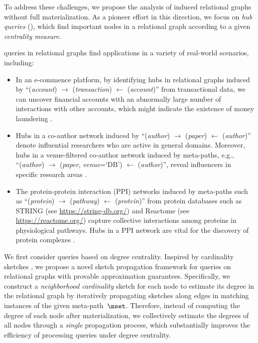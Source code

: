 To address these challenges, we propose the analysis of induced relational graphs without full materialization. As a pioneer effort in this direction, we focus on \emph{hub queries} (\ced), which find important nodes in a relational graph according to a given \emph{centrality measure}.

 \ced queries in relational graphs find applications in a variety of real-world scenarios, including:
\begin{itemize}[leftmargin=*]
    \item {} In an e-commence platform, by identifying hubs in relational graphs induced by ``(\emph{account}) $\rightarrow$ (\emph{transaction}) $\leftarrow$ (\emph{account})'' from transactional data, we can uncover financial accounts with an abnormally large number of interactions with other accounts, which might indicate the existence of money laundering \cite{cao2017hitfraud}.
    \item {} Hubs in a co-author network induced by ``(\emph{author}) $\rightarrow$ (\emph{paper}) $\leftarrow$ (\emph{author})'' \cite{mihara2015influence} denote influential researchers who are active in general domains. Moreover, hubs in a venue-filtered co-author network induced by meta-paths, e.g., ``(\emph{author}) $\rightarrow$ (\emph{paper}, \emph{venue}=`DB') $\leftarrow$ (\emph{author})'', reveal influencers in specific research areas \cite{shi2016constrained, li2014hrank}.
    \item {} The protein-protein interaction (PPI) networks induced by meta-paths such as ``(\emph{protein}) $\rightarrow$ (\emph{pathway}) $\leftarrow$ (\emph{protein})'' from protein databases such as \textsf{STRING} (see \url{https://string-db.org/}) and \textsf{Reactome} (see \url{https://reactome.org/}) capture collective interactions among proteins in physiological pathways. Hubs in a PPI network are vital for the discovery of protein complexes \cite{wu2009core, srihari2013survey}.
\end{itemize}

We first consider \ced queries based on degree centrality. Inspired by cardinality sketches \cite{estan2003bitmap, alon1996space, durand2003loglog, heule2013hyperloglog, gibbons2001distinct}, we propose a novel sketch propagation framework for \ced queries on relational graphs with provable approximation guarantees. Specifically, we construct a \emph{neighborhood cardinality} sketch for each node to estimate its degree in the relational graph by iteratively propagating sketches along edges in matching instances of the given meta-path~$\mset$. Therefore, instead of computing the degree of each node after materialization, we collectively estimate the degrees of all nodes through a \emph{single} propagation process, which substantially improves the efficiency of processing \ced queries under degree centrality.

